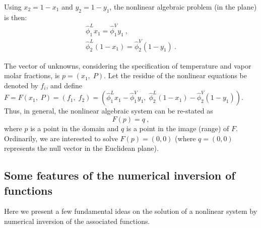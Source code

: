 \documentclass[journal=iecred,manuscript=article]{achemso}
\theoremstyle{definition}
\theoremstyle{remark}
\begin{document}
Using $x_2 = 1 - x_1$ and $y_2 = 1 - y_1$, the nonlinear algebraic problem (in the plane) is then:
\begin{subequations} \label{eq:sistema_problema}
\begin{eqnarray}
\hat{\phi}_1^L x_1 = \hat{\phi}_1^V y_1\:, \\
\hat{\phi}_2^L (1-x_1) = \hat{\phi}_2^V (1-y_1)\:.
\end{eqnarray}
\end{subequations}

The vector of unknowns, considering the specification of temperature and vapor molar fractions, is $p = (x_1,\;P)$. Let the residue of the nonlinear equations be denoted by $f_i$, and define  $F =F(x_1,\;P)=(f_1,\;f_2)= (\hat{\phi}_1^L x_1 - \hat{\phi}_1^V y_1,\;\hat{\phi}_2^L (1-x_1) - \hat{\phi}_2^V (1-y_1))$. 
Thus, in general, the nonlinear algebraic system can be re-stated as
%
\begin{equation}
F(p) = q\: ,
\end{equation}
where $p$ is a point in the domain and $q$ is a point in the 
image (range) of $F$. Ordinarily, we are interested to 
solve $F(p) = (0,0)$ (where $q=(0,0)$ represents the null
 vector in the Euclidean plane).

\subsection{Some features of the numerical 
 inversion of 
functions}
Here we present a few fundamental ideas on the solution 
of a nonlinear system by numerical inversion of the
associated functions.
\end{document}

